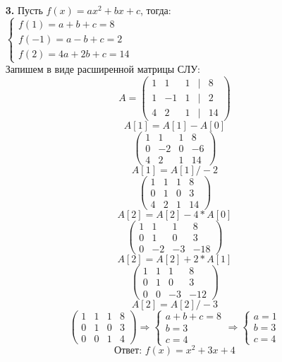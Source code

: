 \documentclass[a4paper]{article}
\newcommand{\mat}[1]{\begin{pmatrix} #1 \end{pmatrix}}
\renewcommand{\r}{\Rightarrow}
\begin{document}
\begin{enumerate}
    \item[\textbf{3.}]
    Пусть $f(x) = ax^2+bx+c$, тогда:\\
    $\begin{cases}
        f(1) = a+b+c=8\\
        f(-1)= a-b+c=2\\
        f(2) = 4a+2b+c=14
    \end{cases}$\\
    Запишем в виде расширенной матрицы СЛУ:\\
    \[A = \mat{
        1 & 1 & 1 & | & 8 \\
        1 & -1 & 1 & | & 2 \\
        4 & 2 & 1 & | & 14 
    }\]
    \[A[1] = A[1]-A[0]\]
    \[
    \begin{pmatrix}
    1 & 1 & 1 & 8 \\
    0 & -2 & 0 & -6 \\
    4 & 2 & 1 & 14
    \end{pmatrix}
    \]
    \[A[1] = A[1]/-2\]
    \[
    \begin{pmatrix}
    1 & 1 & 1 & 8 \\
    0 & 1 & 0 & 3 \\
    4 & 2 & 1 & 14
    \end{pmatrix}
    \]
    \[A[2] = A[2] - 4*A[0]\]
    \[
    \begin{pmatrix}
    1 & 1 & 1 & 8 \\
    0 & 1 & 0 & 3 \\
    0 & -2 & -3 & -18
    \end{pmatrix}
    \]
    \[A[2] = A[2] + 2*A[1]\]
    \[
    \begin{pmatrix}
    1 & 1 & 1 & 8 \\
    0 & 1 & 0 & 3 \\
    0 & 0 & -3 & -12
    \end{pmatrix}
    \]
    \[A[2] = A[2]/-3\]
    \[
    \begin{pmatrix}
    1 & 1 & 1 & 8 \\
    0 & 1 & 0 & 3 \\
    0 & 0 & 1 & 4
    \end{pmatrix}\r
    \begin{cases}
    a + b + c = 8 \\
    b = 3 \\
    c = 4
    \end{cases}
    \r
    \begin{cases}
        a = 1 \\
        b = 3 \\
        c = 4
    \end{cases}\]
    \[\textbf{Ответ: } f(x) = x^2+3x+4\]


\end{enumerate}
\end{document}

